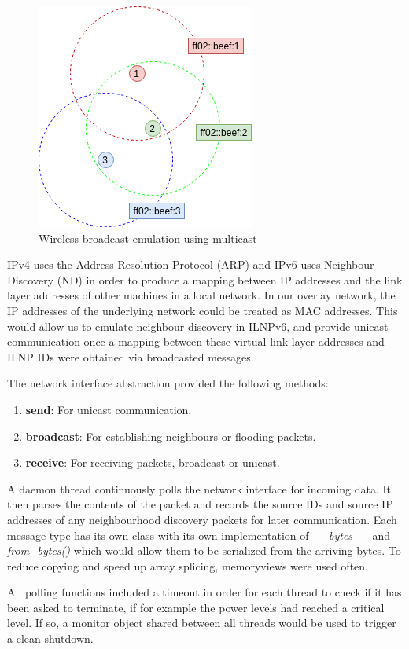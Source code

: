 \documentclass[12pt]{article}
\begin{document}
\begin{figure}[!ht]
	\centering
	\includegraphics[width=0.5\linewidth]{images/mcast}
	\caption{Wireless broadcast emulation using multicast}
	\label{fig:mcast}
\end{figure}

IPv4 uses the Address Resolution Protocol (ARP) and IPv6 uses Neighbour Discovery (ND) in order to produce a mapping between IP addresses and the link layer addresses of other machines in a local network. In our overlay network, the IP addresses of the underlying network could be treated as MAC addresses. This would allow us to emulate neighbour discovery in ILNPv6, and provide unicast communication once a mapping between these virtual link layer addresses and ILNP IDs were obtained via broadcasted messages. 

The network interface abstraction provided the following methods:
\begin{enumerate}
	\item \textbf{send}: For unicast communication.
	\item \textbf{broadcast}: For establishing neighbours or flooding packets.
	\item \textbf{receive}: For receiving packets, broadcast or unicast.
\end{enumerate}

A daemon thread continuously polls the network interface for incoming data. It then parses the contents of the packet and records the source IDs and source IP addresses of any neighbourhood discovery packets for later communication. Each message type has its own class with its own implementation of \emph{\_\_bytes\_\_} and \emph{from\_bytes()} which would allow them to be serialized from the arriving bytes. To reduce copying and speed up array splicing, memoryviews were used often.

All polling functions included a timeout in order for each thread to check if it has been asked to terminate, if for example the power levels had reached a critical level. If so, a monitor object shared between all threads would be used to trigger a clean shutdown.
\end{document}
